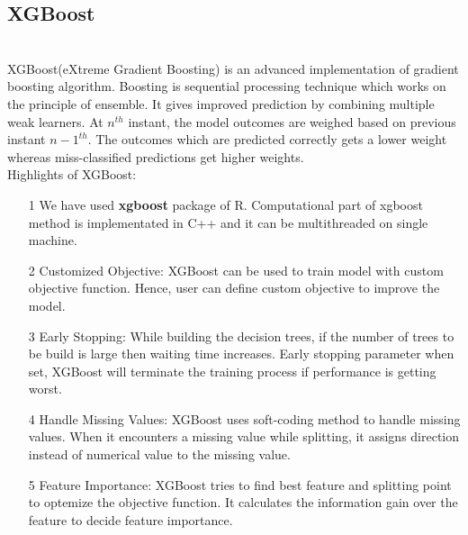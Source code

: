 \documentclass[fleqn,10pt]{SelfArx} %
\begin{document}
\subsection{XGBoost}\\
XGBoost(eXtreme Gradient Boosting) is an advanced implementation of gradient boosting algorithm. Boosting is sequential processing technique which works on the principle of ensemble. It gives improved prediction by combining multiple weak learners. At $n^{th}$ instant, the model outcomes are weighed based on previous instant $n-1^{th}$. The outcomes which are predicted correctly gets a lower weight whereas miss-classified predictions get higher weights.\\
Highlights of XGBoost:
\begin{itemize}
    \item[1] We have used \textbf{xgboost} package of R. Computational part of xgboost method is implementated in C++ and it can be multithreaded on single machine.
    \item[2] Customized Objective: XGBoost can be used to train model with custom objective function. Hence, user can define custom objective to improve the model.
    \item[3] Early Stopping: While building the decision trees, if the number of trees to be build is large then waiting time increases. Early stopping parameter when set, XGBoost will terminate the training process if performance is getting worst.  
    \item[4] Handle Missing Values: XGBoost uses soft-coding method to handle missing values. When it encounters a missing value while splitting, it assigns direction instead of numerical value to the missing value.
    \item[5] Feature Importance: XGBoost tries to find best feature and splitting point to optemize the objective function. It calculates the information gain over the feature to decide feature importance.
\end{itemize}
\end{document}
